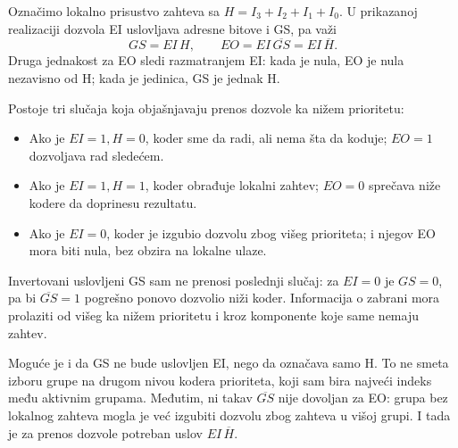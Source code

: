 
Označimo lokalno prisustvo zahteva sa \(H=I_3+I_2+I_1+I_0\). U prikazanoj realizaciji dozvola EI uslovljava adresne bitove i GS, pa važi
\[
 GS=EI\,H,\qquad
 EO=EI\,\overline{GS}=EI\,\overline H.
\]
Druga jednakost za EO sledi razmatranjem EI: kada je nula, EO je nula nezavisno od H; kada je jedinica, GS je jednak H.

Postoje tri slučaja koja objašnjavaju prenos dozvole ka nižem prioritetu:
\begin{itemize}
\item Ako je \(EI=1,H=0\), koder sme da radi, ali nema šta da koduje; \(EO=1\) dozvoljava rad sledećem.
\item Ako je \(EI=1,H=1\), koder obrađuje lokalni zahtev; \(EO=0\) sprečava niže kodere da doprinesu rezultatu.
\item Ako je \(EI=0\), koder je izgubio dozvolu zbog višeg prioriteta; i njegov EO mora biti nula, bez obzira na lokalne ulaze.
\end{itemize}

Invertovani uslovljeni GS sam ne prenosi poslednji slučaj: za \(EI=0\) je \(GS=0\), pa bi \(\overline{GS}=1\) pogrešno ponovo dozvolio niži koder. Informacija o zabrani mora prolaziti od višeg ka nižem prioritetu i kroz komponente koje same nemaju zahtev.

Moguće je i da GS ne bude uslovljen EI, nego da označava samo H. To ne smeta izboru grupe na drugom nivou kodera prioriteta, koji sam bira najveći indeks među aktivnim grupama. Međutim, ni takav \(\overline{GS}\) nije dovoljan za EO: grupa bez lokalnog zahteva mogla je već izgubiti dozvolu zbog zahteva u višoj grupi. I tada je za prenos dozvole potreban uslov \(EI\,\overline H\).
